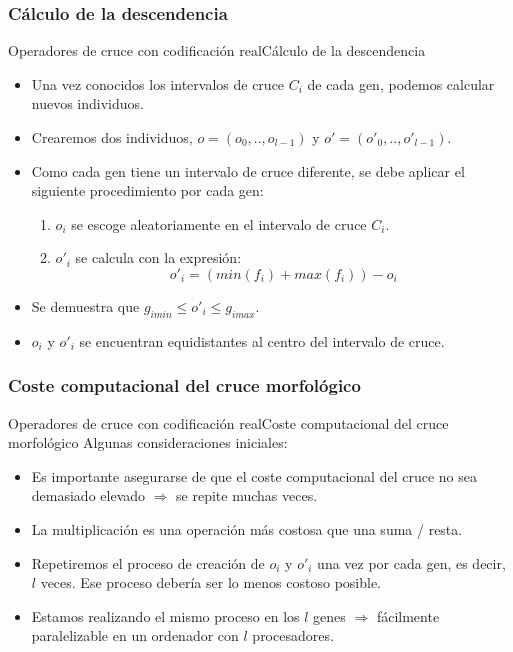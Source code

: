 \documentclass[10pt]{beamer}
\begin{document}
\subsubsection{Cálculo de la descendencia}
\begin{frame}{Operadores de cruce con codificación real}{Cálculo de la descendencia}
	\begin{itemize}
		\item Una vez conocidos los intervalos de cruce $C_{i}$ de cada gen, podemos calcular nuevos individuos.
		\item Crearemos dos individuos, $o = (o_{0},.., o_{l-1})$ y $o' = (o'_{0},.., o'_{l-1}) $.
		\item Como cada gen tiene un intervalo de cruce diferente, se debe aplicar el siguiente procedimiento por cada gen:
		\begin{enumerate}
			\item $o_{i}$ se escoge aleatoriamente en el intervalo de cruce $C_{i}$.
			\item $o'_{i}$ se calcula con la expresión: \begin{equation*}
				o'_{i} = (min(f_{i}) + max(f_{i})) - o_{i}
			\end{equation*}
		\end{enumerate}
		
		\item Se demuestra que $g_{imin} \leq o'_{i} \leq g_{imax}$.
		\item $o_{i}$ y $o'_{i}$ se encuentran equidistantes al centro del intervalo de cruce.
	\end{itemize}
\end{frame}



\subsubsection{Coste computacional del cruce morfológico}

\begin{frame}{Operadores de cruce con codificación real}{Coste computacional del cruce morfológico}
Algunas consideraciones iniciales:
	\begin{itemize}
		\item Es importante asegurarse de que el coste computacional del cruce no sea demasiado elevado $\Rightarrow$ se repite muchas veces.
		\item La multiplicación es una operación más costosa que una suma / resta.
		\item Repetiremos el proceso de creación de $o_{i}$ y $o'_{i}$ una vez por cada gen, es decir, $l$ veces. Ese proceso debería ser lo menos costoso posible.
		\item Estamos realizando el mismo proceso en los $l$ genes $\Rightarrow$ fácilmente paralelizable en un ordenador con $l$ procesadores.
	\end{itemize}
\end{frame}
\end{document}
